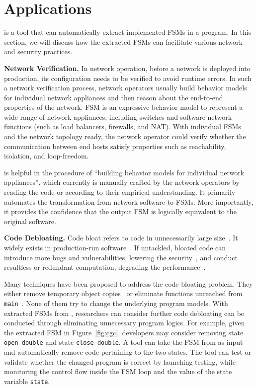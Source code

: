 \section{Applications}

\Tool{} is a tool that can automatically extract implemented FSMs in a program. 
In this section, we will discuss how the extracted FSMs can facilitate 
various network and security practices.  


\noindent\textbf{Network Verification.}  In network operation, before a network 
is deployed into production, its configuration needs to be verified to avoid 
runtime errors. In such a network verification process, network operators 
usually build behavior models for individual network appliances and then 
reason about the end-to-end properties of the network\cite{mai2011debugging,khurshid2013veriflow,kazemian2012header,kazemian2013real,fayaz2016buzz,panda2017verifying}. FSM is an expressive 
behavior model to represent a wide range of network appliances, including 
switches and software network functions (such as load balancers, firewalls, 
and NAT). With individual FSMs and the network topology ready, the network 
operator could verify whether the communication between end hosts satisfy 
properties such as reachability, isolation, and loop-freedom.\cite{}

\Tool{} is helpful in the procedure of ``building behavior models for 
individual network appliances'', which currently is manually crafted by 
the network operators by reading the code or according to their 
empirical understanding. It primarily automates the 
transformation from network software to FSMs. More importantly, it 
provides the confidence that the output FSM is logically equivalent 
to the original software.

\noindent\textbf{Code Debloating.}
Code bloat refers to code in unnecessarily large size~\cite{code-bloat}.
It widely exists in production-run software~\cite{code-bloat-study}. 
If untackled, bloated code can introduce more bugs and vulnerabilities, 
lowering the security~\cite{protocol-mao}, 
and conduct resultless or redundant computation, 
degrading the performance~\cite{BloatFSE2008,XuBloatPLDI2009,XuBloatPLDI2010}. 

Many techniques have been proposed to address the code bloating problem. 
They either remove temporary object copies~\cite{BloatFSE2008,XuBloatPLDI2009,
XuBloatPLDI2010,Reusable,Cachetor} 
or eliminate functions unreached from 
\texttt{main}~\cite{container-debloating-1, 
container-debloating-2, dinghao-1}. 
None of them try to change the underlying program models.
With extracted FSMs from \Tool{}, researchers can consider 
further code debloating can be conducted through
eliminating unnecessary program logics. 
For example, given the extracted FSM in Figure~\ref{fig:cgc}, 
developers may consider removing state \texttt{open\_double} and 
state \texttt{close\_double}. 
A tool can take the FSM from \Tool{} as input and automatically 
remove code pertaining to the two states. 
The tool can test or validate whether the changed program is correct 
by launching testing, while monitoring the control flow 
inside the FSM loop and the value of the state variable \texttt{state}.

